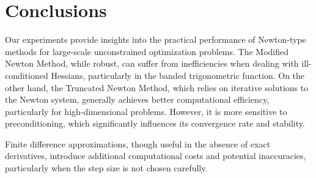 \section{Conclusions}
\label{sec:conclusions}

Our experiments provide insights into the practical performance of Newton-type methods for large-scale unconstrained optimization problems. The Modified Newton Method, while robust, can suffer from inefficiencies when dealing with ill-conditioned Hessians, particularly in the banded trigonometric function.
On the other hand, the Truncated Newton Method, which relies on iterative solutions to the Newton system, generally achieves better computational efficiency, particularly for high-dimensional problems.
However, it is more sensitive to preconditioning, which significantly influences its convergence rate and stability.

Finite difference approximations, though useful in the absence of exact derivatives, introduce additional computational costs and potential inaccuracies, particularly when the step size is not chosen carefully.